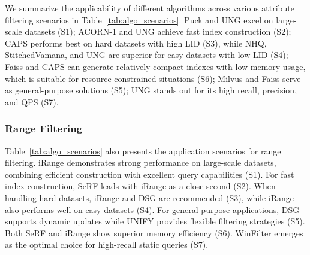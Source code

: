 \documentclass[sigconf, nonacm]{acmart}
\begin{document}
\begin{sloppypar}
\begin{table}[t]
\centering
\setlength{\abovecaptionskip}{0.05cm}
\caption{Algorithm Recommendation per Scenario}
\label{tab:algo_scenarios}
\vspace{-0.1cm}
\end{table}


We summarize the applicability of different algorithms across various attribute filtering scenarios in Table~\ref{tab:algo_scenarios}.
Puck and UNG excel on large-scale datasets (S1); ACORN-1 and UNG achieve fast index construction (S2); CAPS performs best on hard datasets with high LID (S3), while NHQ, StitchedVamana, and UNG are superior for easy datasets with low LID (S4); Faiss and CAPS can generate relatively compact indexes with low memory usage, which is suitable for resource-constrained situations (S6); Milvus and Faiss serve as general-purpose solutions (S5); UNG stands out for its high recall, precision, and QPS (S7).

\subsubsection{\textbf{Range Filtering}}


Table~\ref{tab:algo_scenarios} also presents the application scenarios for range filtering. iRange demonstrates strong performance on large-scale datasets, combining efficient construction with excellent query capabilities (S1). For fast index construction, SeRF leads with iRange as a close second (S2). When handling hard datasets, iRange and DSG are recommended (S3), while iRange also performs well on easy datasets (S4). For general-purpose applications, DSG supports dynamic updates while UNIFY provides flexible filtering strategies (S5). Both SeRF and iRange show superior memory efficiency (S6). WinFilter emerges as the optimal choice for high-recall static queries (S7).


\end{sloppypar}
\end{document}
